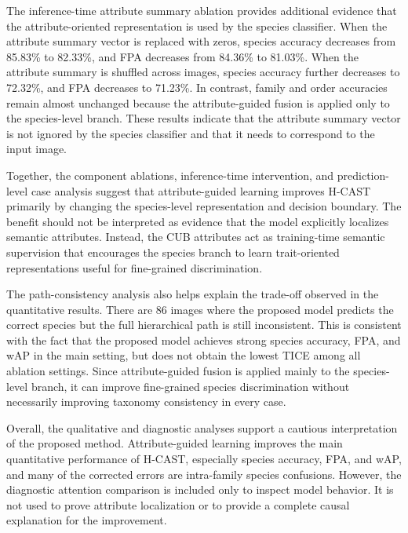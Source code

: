 The inference-time attribute summary ablation provides additional evidence that the attribute-oriented representation is used by the species classifier. When the attribute summary vector is replaced with zeros, species accuracy decreases from 85.83\% to 82.33\%, and FPA decreases from 84.36\% to 81.03\%. When the attribute summary is shuffled across images, species accuracy further decreases to 72.32\%, and FPA decreases to 71.23\%. In contrast, family and order accuracies remain almost unchanged because the attribute-guided fusion is applied only to the species-level branch. These results indicate that the attribute summary vector is not ignored by the species classifier and that it needs to correspond to the input image.

Together, the component ablations, inference-time intervention, and prediction-level case analysis suggest that attribute-guided learning improves H-CAST primarily by changing the species-level representation and decision boundary. The benefit should not be interpreted as evidence that the model explicitly localizes semantic attributes. Instead, the CUB attributes act as training-time semantic supervision that encourages the species branch to learn trait-oriented representations useful for fine-grained discrimination.

The path-consistency analysis also helps explain the trade-off observed in the quantitative results. There are 86 images where the proposed model predicts the correct species but the full hierarchical path is still inconsistent. This is consistent with the fact that the proposed model achieves strong species accuracy, FPA, and wAP in the main setting, but does not obtain the lowest TICE among all ablation settings. Since attribute-guided fusion is applied mainly to the species-level branch, it can improve fine-grained species discrimination without necessarily improving taxonomy consistency in every case.

Overall, the qualitative and diagnostic analyses support a cautious interpretation of the proposed method. Attribute-guided learning improves the main quantitative performance of H-CAST, especially species accuracy, FPA, and wAP, and many of the corrected errors are intra-family species confusions. However, the diagnostic attention comparison is included only to inspect model behavior. It is not used to prove attribute localization or to provide a complete causal explanation for the improvement.
